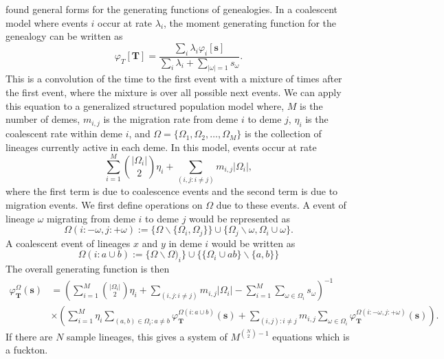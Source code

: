 \citet{Lohse2011} found general forms for the generating functions of genealogies.  In a coalescent model where events
$i$ occur at rate $ \lambda_i $, the moment generating function for the genealogy can be written as
\begin{equation}
  \varphi_{T}\left[ \mathbf{T} \right] = \frac{
    \sum_i \lambda_i \varphi_i[\mathbf{s}]}{
    \sum_i \lambda_i + \sum_{|\omega|=1}s_{\omega}}.
\end{equation}
This is a convolution of the time to the first event with a mixture of times after the first event, where the mixture is
over all possible next events. We can apply this equation to a generalized structured population model where, $M$ is the
number of demes, $m_{i,j}$ is the migration rate from deme $i$ to deme $j$, $\eta_i$ is the coalescent rate within deme
$i$, and $\Omega = \{ \Omega_1, \Omega_2, \ldots , \Omega_M \}$ is the collection of lineages currently active in each
deme. In this model, events occur at rate
\begin{equation}
  \sum_{i=1}^M \binom{|\Omega_i|}{2}\eta_i + \sum_{(i,j:i \neq j)} m_{i,j}|\Omega_i|,
\end{equation}
where the first term is due to coalescence events and the second term is due to migration events. We first define
operations on $\Omega$ due to these events. A event of lineage $\omega$ migrating from deme $i$ to deme $j$ would be
represented as 
\begin{equation*}
  \Omega\left( i  :-\omega,j: + \omega \right) := \{ \Omega\backslash \{\Omega_i, \Omega_j \} \} \cup
  \{\Omega_j\backslash \omega, \Omega_i \cup \omega \}. 
\end{equation*}
A coalescent event of lineages $x$ and $y$ in deme $i$ would be
written as 
\begin{equation*}
  \Omega(i:a \cup b):=\{ \Omega \backslash \Omega)_i \}\cup\{ \{\Omega_i \cup ab \}\backslash \{ a,b \}\}
\end{equation*}
The overall generating function is then
\begin{align}
  \varphi_{\mathbf{T}}^{\Omega}(\mathbf{s}) &=
  \left( \sum_{i=1}^M \binom{|\Omega_i|}{2}\eta_i  + \sum_{(i,j:i \neq j)} m_{i,j}|\Omega_i| -
  \sum_{i=1}^M \sum_{\omega \in \Omega_i}s_{\omega}\right)^{-1} \\
  &\times \left( \sum_{i=1}^M \eta_i \sum_{(a,b) \in \Omega_i:a \neq b}
  \varphi_{\mathbf{T}}^{\Omega(i:a \cup b)}(\mathbf{s}) + 
  \sum_{(i,j):i\neq j}m_{i,j}\sum_{\omega \in \Omega_i} \varphi_{\mathbf{T}}^{\Omega\left( i :-\omega, j: + \omega \right)}(\mathbf{s})\right).
\end{align}
If there are $N$ sample lineages, this gives a system of  $M^{\binom{N}{2}-1}$ equations which is a fuckton. 

